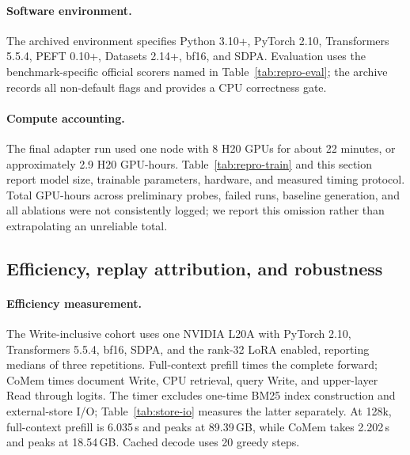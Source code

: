 \paragraph{Software environment.}
The archived environment specifies Python 3.10+, PyTorch 2.10,
Transformers 5.5.4, PEFT 0.10+, Datasets 2.14+, bf16, and SDPA. Evaluation uses
the benchmark-specific official scorers named in Table~\ref{tab:repro-eval}; the
archive records all non-default flags and provides a CPU correctness gate.

\paragraph{Compute accounting.}
The final adapter run used one node with 8 H20 GPUs for about 22 minutes, or
approximately 2.9 H20 GPU-hours. Table~\ref{tab:repro-train} and this section
report model size, trainable parameters, hardware, and measured timing protocol.
Total GPU-hours across preliminary probes, failed runs, baseline generation, and
all ablations were not consistently logged; we report this omission rather than
extrapolating an unreliable total.

\subsection{Efficiency, replay attribution, and robustness}
\paragraph{Efficiency measurement.}
\label{app:efficiency}
The Write-inclusive cohort uses one NVIDIA L20A with PyTorch 2.10,
Transformers 5.5.4, bf16, SDPA, and the rank-32 LoRA enabled, reporting medians
of three repetitions. Full-context prefill times the complete forward; CoMem
times document Write, CPU retrieval, query Write, and upper-layer Read through
logits. The timer excludes one-time BM25 index construction and external-store
I/O; Table~\ref{tab:store-io} measures the latter separately. At 128k,
full-context prefill is 6.035\,s and peaks at 89.39\,GB, while CoMem takes
2.202\,s and peaks at 18.54\,GB. Cached decode uses 20 greedy steps.

